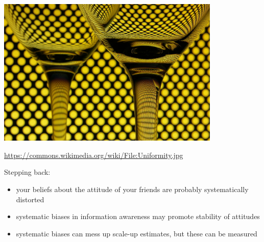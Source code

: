 \documentclass[aspectratio=169]{beamer}
\begin{document}
\begin{frame}

\begin{center}
\includegraphics[width=0.8\textwidth]{figures/distortion.jpg}
\end{center}

\vfill
\tiny{\url{https://commons.wikimedia.org/wiki/File:Uniformity.jpg}}

\end{frame}
\begin{frame}

Stepping back:
\begin{itemize}
\item your beliefs about the attitude of your friends are probably systematically distorted \pause
\item systematic biases in information awareness may promote stability of attitudes \pause
\item systematic biases can mess up scale-up estimates, but these can be measured
\end{itemize}

\end{frame}
\end{document}
